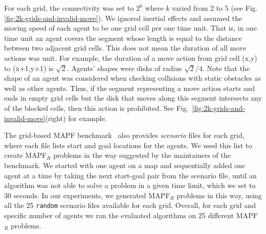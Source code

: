 \documentclass[review]{elsarticle}
\newcommand\konstantin[1]{\nb{\textbf{Konstantin:}}{red}{#1}}
\newcommand{\mapfr}{\ac{MAPF}$_R$\xspace}
\newcommand{\mapf}{\ac{MAPF}\xspace}
\begin{document}



For each grid, the connectivity was set to $2^k$ where $k$ varied from $2$ to $5$ (see Fig.\ref{fig:2k-grids-and-invalid-move}). We ignored inertial effects and assumed the moving speed of each agent to be one grid cell per one time unit. That is, in one time unit an agent covers the segment whose length is equal to the distance between two adjacent grid cells. 
This does not mean the duration of all move actions was unit. 
For example, the duration of a move action from grid cell (x,y) to (x+1,y+1) is $\sqrt{2}$. 
Agents' shapes were disks of radius $\sqrt{2}/{4}$. %
Note that the shape of an agent was considered when checking collisions with static obstacles as well as other agents. Thus, if the segment representing a move action starts and ends in empty grid cells but the disk that moves along this segment intersects any of the blocked cells, then this action is prohibited. See Fig.~\ref{fig:2k-grids-and-invalid-move}(right) for example.


The grid-based \mapf benchmark~\cite{stern2019mapf} also provides \emph{scenario} files for each grid, 
where each file lists start and goal locations for the agents. We used this list to create \mapfr problems in the way suggested by the maintainers of the benchmark. We started with one agent on a map and sequentially added one agent at a time by taking the next start-goal pair from the scenario file, until an algorithm was not able to solve a problem in a given time limit, which we set to 30 seconds. 
In our experiments, we generated \mapfr problems in this way, using all the 25 \texttt{random} scenario files available for each grid. 
Overall, for each grid and specific number of agents we ran the evaluated algorithms on 25 different \mapfr problems.
\end{document}
